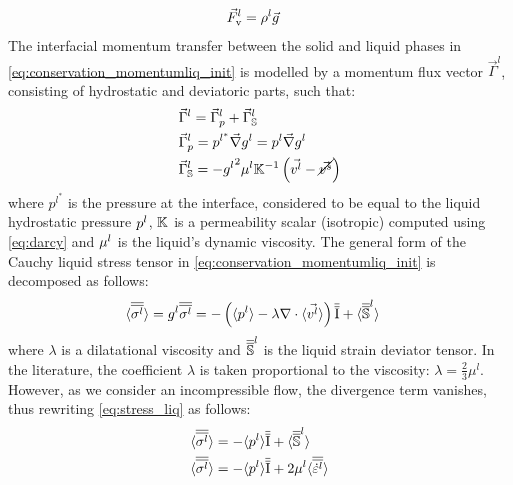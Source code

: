 \begin{align}
\label{eq:fluid_weight}
& \vec{F}_{\text{v}}^l = \rho^l \vec{g}
\end{align}
The interfacial momentum transfer between the solid and liquid phases in \cref{eq:conservation_momentumliq_init} is modelled 
by a momentum flux vector $\vec{\Gamma}^{l}$, consisting of hydrostatic and deviatoric parts, such that:
\begin{align}
	\label{eq:interfacial_momentum_total}
	& \vec{\Gamma}^{l} =  \vec{\Gamma}_{p}^{l} + \vec{\Gamma}_{\mathbb{S}}^{l}	\\
	\label{eq:interfacial_momentum_hydrostatic}
	& \vec{\Gamma}_{p}^{l} = p^{l^{*}} \vec{\nabla} g^{l} = p^{l} \vec{\nabla} g^{l}		\\
	\label{eq:interfacial_momentum_deviatoric}
	& \vec{\Gamma}_{\mathbb{S}}^{l} = - {g^l}^2 \mu^l \mathbb{K}^{-1} \left(  \vec{v^l} - \cancel{\vec{v^s}}  \right)  
\end{align}
where $p^{l^{*}}$ is the pressure at the interface, considered to be equal to the liquid hydrostatic 
pressure ${p^l}$, $\mathbb{K}$ is a permeability scalar (isotropic) computed using \cref{eq:darcy} and $\mu^l$ is the liquid's 
dynamic viscosity. The general form of the Cauchy liquid stress tensor in \cref{eq:conservation_momentumliq_init} 
is decomposed as follows: 
\begin{align}
\label{eq:stress_liq}
& \langle {\overline{\overline{\sigma^l}}} \rangle = {g^l} {\overline{\overline{\sigma^l}}} = - \left( \langle {p^l} \rangle -\lambda \nabla \cdot \langle \vec{v^l} \rangle \right) {\overline{\overline{\mathrm{I}}}} + \langle {\overline{\overline{\mathbb{S}}}}^{l} \rangle
\end{align}
where $\lambda$ is a dilatational viscosity \citep{dantzig_solidification_2009} and ${\overline{\overline{\mathbb{S}}}}^{l}$ is the
liquid strain deviator tensor. In the literature, the coefficient $\lambda$ is taken proportional to the 
viscosity: $\lambda = \frac{2}{3} \mu^l $. However, as we consider an incompressible flow, the divergence 
term vanishes, thus rewriting \cref{eq:stress_liq} as follows:
\begin{subequations} 
\begin{align}
\label{eq:stress_liq_incompressible1}
& \langle {\overline{\overline{\sigma^l}}} \rangle = - \langle {p^l} \rangle {\overline{\overline{\mathrm{I}}}} + \langle {\overline{\overline{\mathbb{S}}}}^{l} \rangle \\
\label{eq:stress_liq_incompressible2}
& \langle {\overline{\overline{\sigma^l}}} \rangle = - \langle {p^l} \rangle {\overline{\overline{\mathrm{I}}}} + 2 \mu^l \langle {\overline{\overline{\dot{\varepsilon}^l}}} \rangle 
\end{align}
\end{subequations}
